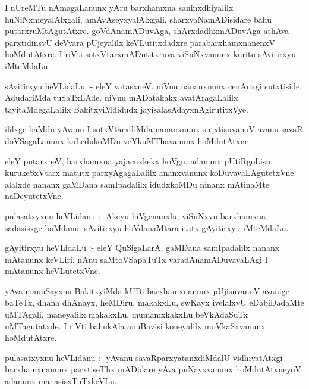 \documentclass{article}
\begin{document}
\begin{mn}
I nUreMTu nAmagaLanunx  yAru  barxhamxna saninxdhiyalilx huNiNxmeyalAlxgali, amAvAseyxyalAlxgali, 
sharxvaNamADisidare bahu putarxruMtAgutAtxre.  goVdAnamADuvAga, shArxdadhxmADuvAga athAva 
parxtidinsvU  deVvara pUjeyalilx  keVLutitxdadxre  parabarxhamxnanenxV  hoMdutAtxre.  
I riVti  sotxVtarxmADutitxruva viSuNxvanunx  kuritu  sAvitirxyu iMteMdaLu.
\end{mn}

\begin{mn}
sAvitirxyu  heVLidaLu :- eleY  vatasxneV, niVnu nananxnunx cenAnxgi sutxtiside.  
AdudariMda tuSaTxLAde.  niVnu mADatakakx avatAragaLalilx  tayitaMdegaLalilx  
BakitxyiMdidudx  jayisalasAdayxnAgirutitxVye.
\end{mn}

\begin{mn}
ililxge baMdu yAvanu  I  sotxVtarxdiMda nananxnunx sutxtisuvanoV avanu savaR 
doVSagaLanunx  kaLedukoMDu  veYkuMThavanunx  hoMdutAtxne. 
\end{mn}

\begin{mn}
eleY putarxneV,  barxhamxna  yajacnxkekx  hoVgu,  adanunx  pUtiRgoLisu.  
kurukeSxVtarx matutx parxyAgagaLalilx ananxvanunx koDuvavaLAgutetxVne. 
alalxde  nananx  gaMDana  samIpadalilx  idudxkoMDu  ninanx mAtinaMte  naDeyutetxVne. 
\end{mn}

\begin{mn}
pulasatxyxnu  heVLidanu :- Akeyu  hiVgenanxlu,  viSuNxvu  barxhamxna  sadasisxge 
baMdanu. sAvitirxyu  hoVdanaMtara  itatx gAyitirxyu iMteMdaLu.
\end{mn}

\begin{mn}
gAyitirxyu  heVLidaLu :- eleY QuSigaLarA,  gaMDana  samIpadalilx nananx mAtanunx  
keVLiri.  nAnu saMtoVSapaTuTx  varadAnamADuvavaLAgi  I mAtanunx  heVLutetxVne.
\end{mn}

\begin{mn}
yAva  manuSayxnu  BakitxyiMda  kUDi  barxhamxnanunx pUjisuvanoV  avanige  baTeTx,  
dhana  dhAnayx,  heMDiru,  makakxLu,  swKayx ivelalxvU  eDabiDadaMte  uMTAgali.  
maneyalilx  makakxLu, mumamxkakxLu beVkAdaSuTx  uMTagutatxde.  I riVti 
bahukAla  anuBavisi  koneyalilx moVkaSxvanunx  hoMdutAtxre.
\end{mn}

\begin{mn}
pulasatxyxnu  heVLidanu :- yAvanu  savaRparxyatanxdiMdalU  vidhivatAtxgi  barxhamxnanunx  
parxtiseThx mADidare  yAva  puNayxvanunx  hoMdutAtxneyoV adanunx manasisxTuTxkeVLu.
\end{mn}
\end{document}
